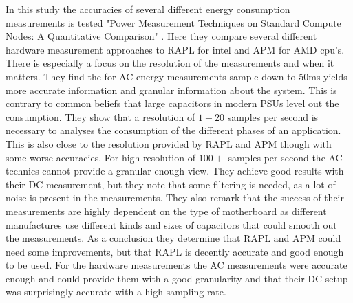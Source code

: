 In this study the accuracies of several different energy consumption measurements is tested "Power Measurement Techniques on Standard
Compute Nodes: A Quantitative Comparison" \cite{hackenberg2013}. Here they compare several different hardware measurement approaches to RAPL for intel and APM for AMD cpu's. There is especially a focus on the resolution of the measurements and when it matters. They find the for AC energy measurements sample down to 50ms yields more accurate information and granular information about the system. This is contrary to common beliefs that large capacitors in modern PSUs level out the consumption. They show that a resolution of $1-20$ samples per second is necessary to analyses the consumption of the different phases of an application. This is also close to the resolution provided by RAPL and APM though with some worse accuracies. For high resolution of $100+$ samples per second the AC technics cannot provide a granular enough view. They achieve good results with their DC measurement, but they note that some filtering is needed, as a lot of noise is present in the measurements. They also remark that the success of their measurements are highly dependent on the type of motherboard as different manufactures use different kinds and sizes of capacitors that could smooth out the measurements. As a conclusion they determine that RAPL and APM could need some improvements, but that RAPL is decently accurate and good enough to be used. For the hardware measurements the AC measurements were accurate enough and could provide them with a good granularity and that their DC setup was surprisingly accurate with a high sampling rate.